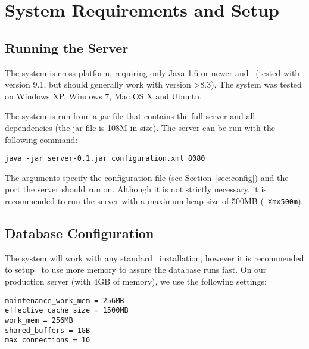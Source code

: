 \label{chap:technical_manual}


\section{System Requirements and Setup}

\subsection{Running the Server}

The system is cross-platform, requiring only Java 1.6 or newer and \postgres~(tested with version 9.1, but should generally work with version >8.3). The system was tested on Windows XP, Windows 7, Mac OS X and Ubuntu.

The system is run from a jar file that contains the full server and all dependencies (the jar file is 108M in size). The server can be run with the following command:

\vspace*{0.5em}
\begin{lstlisting}
java -jar server-0.1.jar configuration.xml 8080
\end{lstlisting}
\vspace*{0.5em}

The arguments specify the configuration file (see Section~\ref{sec:config}) and the port the server should run on. Although it is not strictly necessary, it is recommended to run the server with a maximum heap size of 500MB ({\tt -Xmx500m}).


\subsection{Database Configuration}
\label{sec:dbconfig}

The system will work with any standard \postgres~installation, however it is recommended to setup \postgres~to use more memory to assure the database runs fast. On our production server (with 4GB of memory), we use the following settings:


\vspace*{0.5em}
\begin{lstlisting}
maintenance_work_mem = 256MB
effective_cache_size = 1500MB
work_mem = 256MB
shared_buffers = 1GB
max_connections = 10
\end{lstlisting}
\vspace*{0.5em}

